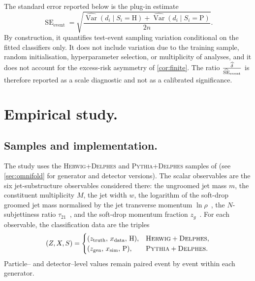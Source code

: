 \documentclass[12pt]{article}
\newcommand{\Herwig}{\mathrm{H}}
\newcommand{\Pythia}{\mathrm{P}}
\newcommand{\1}{\mathbbm{1}}
\renewcommand{\[}{\begin{equation}}
\renewcommand{\]}{\end{equation}}
\begin{document}
    The standard error reported below is the plug-in estimate
    \[
    \label{eq:se}
        \widehat{\operatorname{SE}}_{\mathrm{event}} = \sqrt{ \frac{ \widehat{ \operatorname{Var}}(d_i\mid S_i=\Herwig) + \widehat{\operatorname{Var}}(d_i\mid S_i=\Pythia)}{2n}}.
    \]
    By construction, it quantifies test-event sampling variation conditional on the fitted classifiers only.
    It does not include variation due to the training sample, random initialisation, hyperparameter selection, or multiplicity of analyses, and it does not account for the excess-risk asymmetry of \cref{cor:finite}.
    The ratio \(\frac{\widehat\delta}{\widehat{\operatorname{SE}}_{\rm event}}\) is therefore reported as a scale diagnostic and not as a calibrated significance.

\section{Empirical study.}
\label{sec:empirical}

    \subsection{Samples and implementation.}

    The study uses the \textsc{Herwig}+\textsc{Delphes} and \textsc{Pythia}+\textsc{Delphes} samples of \textcite{andreassen_2019_3548091} (see \cref{sec:omnifold} for generator and detector versions).
    The scalar observables are the six jet-substructure observables considered there: the ungroomed jet mass \(m\), the constituent multiplicity \(M\), the jet width \(w\), the logarithm of the soft-drop groomed jet mass normalised by the jet transverse momentum \(\ln\rho\)~\cite{Larkoski:2014wba}, the \(N\)-subjettiness ratio \(\tau_{21}\)~\cite{Thaler:2010tr}, and the soft-drop momentum fraction \(z_g\)~\cite{Larkoski:2014wba}.
    For each observable, the classification data are the triples
    \[
        (Z,X,S)=
        \begin{cases}
            (z_{\mathrm{truth}},\,x_{\mathrm{data}},\,\Herwig), & \textsc{Herwig}+\textsc{Delphes},\\
            (z_{\mathrm{gen}},\,x_{\mathrm{sim}},\,\Pythia), & \textsc{Pythia}+\textsc{Delphes}.
        \end{cases}
    \]
    Particle-- and detector--level values remain paired event by event within each generator.
\end{document}

